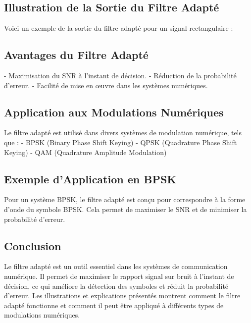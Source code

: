 \documentclass[10pt,a4paper]{article}
\begin{document}
\subsection*{Illustration de la Sortie du Filtre Adapté}
Voici un exemple de la sortie du filtre adapté pour un signal rectangulaire :


\subsection*{Avantages du Filtre Adapté}
- Maximisation du SNR à l'instant de décision.
- Réduction de la probabilité d'erreur.
- Facilité de mise en œuvre dans les systèmes numériques.

\subsection*{Application aux Modulations Numériques}
Le filtre adapté est utilisé dans divers systèmes de modulation numérique, tels que :
- BPSK (Binary Phase Shift Keying)
- QPSK (Quadrature Phase Shift Keying)
- QAM (Quadrature Amplitude Modulation)

\subsection*{Exemple d'Application en BPSK}
Pour un système BPSK, le filtre adapté est conçu pour correspondre à la forme d'onde du symbole BPSK. Cela permet de maximiser le SNR et de minimiser la probabilité d'erreur.

\subsection*{Conclusion}
Le filtre adapté est un outil essentiel dans les systèmes de communication numérique. Il permet de maximiser le rapport signal sur bruit à l'instant de décision, ce qui améliore la détection des symboles et réduit la probabilité d'erreur. Les illustrations et explications présentés montrent comment le filtre adapté fonctionne et comment il peut être appliqué à différents types de modulations numériques.
\end{document}
